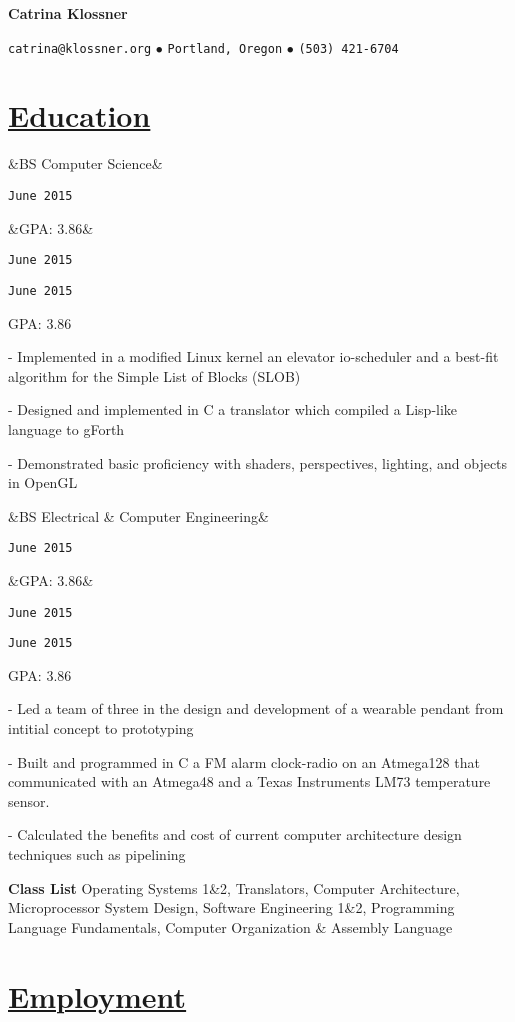 \documentclass[11pt]{article}
\newcommand{\heading}[1]{
    \section*{\uline{\hfill #1}}
}
\newcommand{\squish}{
    \setlength{\itemsep}{0.5pt}
    \setlength{\parskip}{0pt}
    \setlength{\parsep}{0.5pt}
}
\newcommand{\when}[1]{
    \hfill \texttt{#1}
}
\newcommand{\experience}[4]{
    \ifx&#2&
        \item[{#1}]
        \when{#4}
    \else
        \ifx&#3&
            \item[{#1}, \emph{#2}]
            \when{#4}
        \else
            \item[{#1}, \emph{#2}]
            \when{#4}
            \item{#3}
            \when{}
        \fi
    \fi
}
\newcommand{\contact}[4]{
    \centerline{
        \large       
        \texttt{#1}
        $\bullet$
        \texttt{#2}
        $\bullet$
        \texttt{#3}
    }
    \centerline{
        \emph{#4}
    }
}
\newcommand{\skill}[2]{
    \textbf{#1} \hfill #2
}
\newcommand{\CPP}{
    C\hspace{-.05em}\raisebox{.4ex}{\tiny\bf +}\hspace{-.10em}\raisebox{.4ex}{\tiny\bf +}
}
\begin{document}
\centerline{{\Huge \bf Catrina Klossner}}
\bigskip

\contact{catrina@klossner.org}
        {Portland, Oregon}
        {(503) 421-6704}
        {}

%
%
%
%

\heading{Education}%

\begin{description}
\squish   
\experience{Oregon State University}
           {BS Computer Science}
           {GPA: 3.86}
           {June 2015}

	- Implemented in a modified Linux kernel an elevator io-scheduler and a best-fit algorithm for the Simple List of Blocks (SLOB) 

	- Designed and implemented in C a translator which compiled a Lisp-like language to gForth 

	- Demonstrated basic proficiency with shaders, perspectives, lighting, and objects in OpenGL 


\experience{Oregon State University}
           {BS Electrical \& Computer Engineering}
           {GPA: 3.86}
           {June 2015}

	- Led a team of three in the design and development of a wearable pendant from intitial concept to prototyping 

	- Built and programmed in C a FM alarm clock-radio on an Atmega128 that communicated with an Atmega48 and a Texas Instruments LM73 temperature sensor.

	- Calculated the benefits and cost of current computer architecture design techniques such as pipelining 

\end{description}

\skill{Class List}{Operating Systems 1\&2, Translators, Computer Architecture, Microprocessor System Design, Software Engineering 1\&2, Programming Language Fundamentals, Computer Organization \& Assembly Language}


\heading{Employment}%
\end{document}
